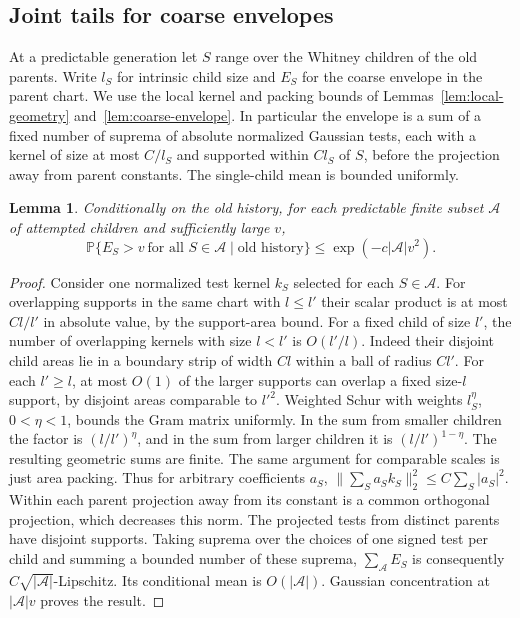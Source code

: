 \documentclass[11pt]{article}
\newtheorem{lemma}{Lemma}
\newcommand{\1}{\mathbf{1}}
\numberwithin{equation}{section}
\newcommand{\PP}{\mathbb P}
\begin{document}
\subsection{Joint tails for coarse envelopes}

At a predictable generation let \(S\) range over the Whitney
children of the old parents. Write \(l_S\) for intrinsic
child size and \(E_S\) for the coarse envelope in the parent
chart. We use the local kernel and packing bounds of
Lemmas~\ref{lem:local-geometry} and~\ref{lem:coarse-envelope}.
In particular the envelope is a sum of a fixed number of
suprema of absolute normalized Gaussian tests, each with
a kernel of size at most \(C/l_S\) and supported within
\(Cl_S\) of \(S\), before the projection away from parent
constants. The single-child mean is bounded uniformly.

\begin{lemma}\label{lem:sc-joint}
Conditionally on the old history, for each predictable finite
subset \(\mathcal A\) of attempted children and sufficiently
large \(v\),
\[
 \PP\{E_S>v\ \text{for all } S\in\mathcal A
                  \mid\text{old history}\}
 \le \exp(-c|\mathcal A|v^2).
\]
\end{lemma}
\begin{proof}
Consider one normalized test kernel \(k_S\) selected for
each \(S\in\mathcal A\). For overlapping supports in
the same chart with \(l\le l'\) their scalar product is
at most \(Cl/l'\) in absolute value, by the support-area
bound. For a fixed child of size \(l'\), the number of
overlapping kernels with size \(l<l'\) is \(O(l'/l)\).
Indeed their disjoint child areas lie in a boundary
strip of width \(Cl\) within a ball of radius \(Cl'\).
For each \(l'\ge l\), at most \(O(1)\) of the larger
supports can overlap a fixed size-\(l\) support, by disjoint
areas comparable to \(l'^2\). Weighted Schur with weights
\(l_S^\eta\), \(0<\eta<1\), bounds the Gram matrix uniformly.
In the sum from smaller children the factor is
\((l/l')^\eta\), and in the sum from larger children it is
\((l/l')^{1-\eta}\). The resulting geometric sums are finite.
The same argument for comparable scales is just area packing.
Thus for arbitrary coefficients \(a_S\),
\(\|\sum_S a_S k_S\|_2^2\le C\sum_S|a_S|^2\).
Within each parent projection away from its constant
is a common orthogonal projection, which decreases this
norm. The projected tests from distinct parents have
disjoint supports. Taking suprema over the choices of
one signed test per child and summing a bounded number
of these suprema, \(\sum_{\mathcal A}E_S\) is consequently
\(C\sqrt{|\mathcal A|}\)-Lipschitz. Its conditional mean is
\(O(|\mathcal A|)\). Gaussian concentration at
\(|\mathcal A|v\) proves the result.
\end{proof}
\end{document}
